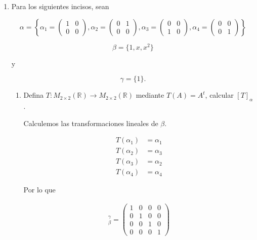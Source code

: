 \documentclass[10pt,a4paper]{article}
\theoremstyle{definition}
\newcommand{\R}{\mathbb{R}}
\begin{document}
\begin{enumerate}
    \item Para los siguientes incisos, sean
    
    \[\alpha = \left\{\alpha_1 = \begin{pmatrix}
        1 & 0\\
        0 & 0
    \end{pmatrix}, \alpha_2 = \begin{pmatrix}
        0 & 1\\
        0 & 0
    \end{pmatrix}, \alpha_3 = \begin{pmatrix}
        0 & 0\\
        1 & 0
    \end{pmatrix}, \alpha_4 = \begin{pmatrix}
        0 & 0\\
        0 & 1
    \end{pmatrix}\right\}\]

    \[\beta = \{1,x,x^2\}\]

    y

    \[\gamma = \{1\}.\]

    \begin{enumerate}
        \item Defina $T: M_{2\times 2}(\R) \rightarrow M_{2\times 2}(\R)$ mediante $T(A) = A^t$, calcular $[T]_\alpha$.
        
        Calculemos las transformaciones lineales de $\beta$.

        \begin{align*}
            T(\alpha_1) &= \alpha_1\\
            T(\alpha_2) &= \alpha_3\\
            T(\alpha_3) &= \alpha_2\\
            T(\alpha_4) &= \alpha_4
        \end{align*}
        
        Por lo que

        \begin{align*}
            [T]^\gamma_\beta = \begin{pmatrix}
                1 & 0 & 0 & 0\\
                0 & 1 & 0 & 0\\
                0 & 0 & 1 & 0\\
                0 & 0 & 0 & 1
            \end{pmatrix}
        \end{align*}


\end{enumerate}
\end{enumerate}
\end{document}
